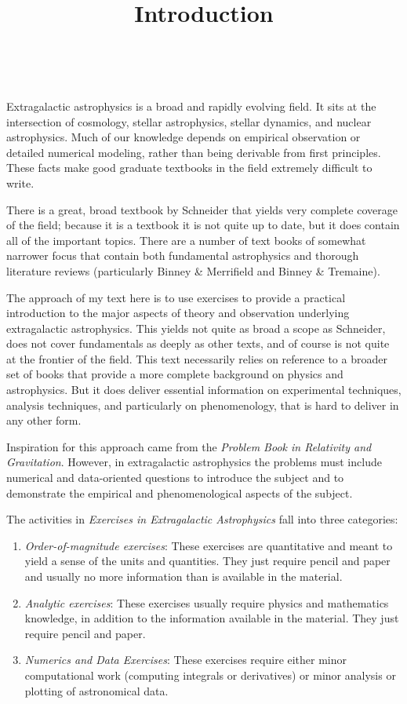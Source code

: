 \documentclass[11pt, preprint, maxnames=9]{aastex}
\begin{document}
\title{\bf Introduction}
~

Extragalactic astrophysics is a broad and rapidly evolving field. It
sits at the intersection of cosmology, stellar astrophysics, stellar
dynamics, and nuclear astrophysics. Much of our knowledge depends on
empirical observation or detailed numerical modeling, rather than
being derivable from first principles. These facts make good graduate
textbooks in the field extremely difficult to write. 

There is a great, broad textbook by Schneider that yields very
complete coverage of the field; because it is a textbook it is not
quite up to date, but it does contain all of the important
topics. There are a number of text books of somewhat narrower focus
that contain both fundamental astrophysics and thorough literature
reviews (particularly Binney \& Merrifield and Binney \& Tremaine).

The approach of my text here is to use exercises to provide a
practical introduction to the major aspects of theory and observation
underlying extragalactic astrophysics. This yields not quite as broad
a scope as Schneider, does not cover fundamentals as deeply as other
texts, and of course is not quite at the frontier of the field.  This
text necessarily relies on reference to a broader set of books that
provide a more complete background on physics and astrophysics. But
it does deliver essential information on experimental techniques,
analysis techniques, and particularly on phenomenology, that is hard
to deliver in any other form.

Inspiration for this approach came from the {\it Problem Book in
  Relativity and Gravitation}. However, in extragalactic astrophysics
the problems must include numerical and data-oriented questions to
introduce the subject and to demonstrate the empirical and
phenomenological aspects of the subject.

The activities in {\it Exercises in Extragalactic Astrophysics} fall
into three categories:
\begin{enumerate}
\item {\it Order-of-magnitude exercises}: These exercises are
  quantitative and meant to yield a sense of the units and
  quantities. They just require pencil and paper and usually no more
  information than is available in the material.
\item {\it Analytic exercises}: These exercises usually require
  physics and mathematics knowledge, in addition to the information
  available in the material. They just require pencil and paper.
\item {\it Numerics and Data Exercises}: These exercises require
  either minor computational work (computing integrals or derivatives)
  or minor analysis or plotting of astronomical data. 
\end{enumerate}
\end{document}
